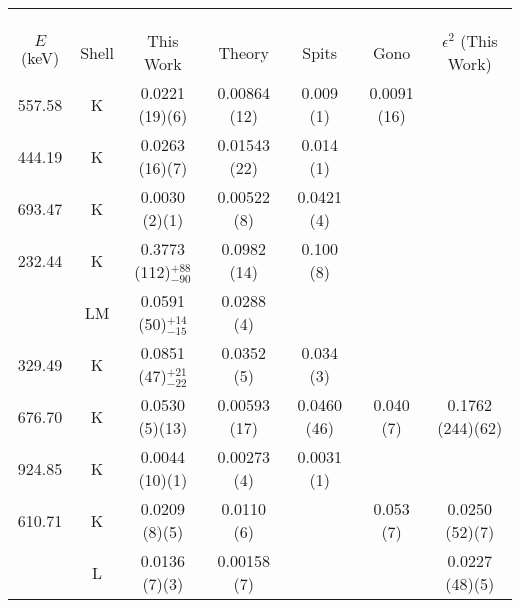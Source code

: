 \begin{table}
    \centering
    \ContinuedFloat
    \begin{subtable}{\textwidth}
    \end{subtable}
    \begin{ThreePartTable}
    \begin{subtable}{\textwidth}
        \begin{tabular}{>{\footnotesize}c|>{\footnotesize}c|>{\footnotesize}c|>{\footnotesize}c|>{\footnotesize}c|>{\footnotesize}c|>{\footnotesize}c}
            \multicolumn{7}{>{\normalsize}c}{TABLE 6.2 (CONTINUED)} \\
            \multicolumn{7}{>{\normalsize}c}{(b)} \\
            \toprule
            & & \multicolumn{4}{c|}{$\alpha$} & \\
            $E$ (keV) & Shell &	This Work	&Theory\citep{kibedi08:_BRICC}	&Spits\citep{spits96:_154gd} & Gono\citep{gono74:_154gd_e0}	& $\epsilon^2$ (This Work)	\\
            \hline
            557.58	& K &	0.0221	(19)(6)	&	0.00864 (12)	&	0.009 (1) & 0.0091 (16)	& \\
            \hline
            444.19	& K &	0.0263	(16)(7)	&	0.01543 (22)	&	0.014 (1)&	\\
            \hline
            693.47	& K &	0.0030	(2)(1)	&	0.00522 (8)	&	0.0421 (4) &	\\
            \hline
            232.44	& K &	0.3773	(112)$^{+88}_{-90}$	&	0.0982 (14)	&	0.100 (8)	& \\
            &	LM &		0.0591	(50)$^{+14}_{-15}$	&	0.0288 (4)	&	&	\\
            \hline
            329.49	 & K &	0.0851	(47)$^{+21}_{-22}$	&	0.0352 (5)	&	0.034 (3)	&\\
            \hline
            676.70	& K &	0.0530	(5)(13)	&	0.00593 (17)	&	0.0460 (46) & 0.040 (7)	& 0.1762 (244)(62)\\
            \hline
            924.85	& K &	0.0044	(10)(1)	&	0.00273 (4)	&	0.0031 (1)	&\\
            \hline
            610.71	& K &	0.0209	(8)(5)	&	0.0110 (6)	& &	0.053 (7)	& 0.0250 (52)(7)\\
            		& L &	0.0136	(7)(3)	&	0.00158 (7)	&	&	& 0.0227 (48)(5) \\
            \bottomrule
        \end{tabular}
        \end{subtable}


\end{ThreePartTable}
\end{table}

